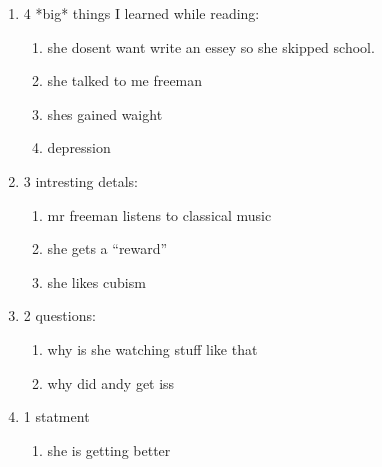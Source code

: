 
\begin{enumerate}
\item 4 *big* things I learned while reading:
  \begin{enumerate}
    \item she dosent want write an essey so she skipped school.
    \item she talked to me freeman 
    \item shes gained waight
    \item depression
  \end{enumerate}
\item 3 intresting detals:
  \begin{enumerate}
    \item mr freeman listens to classical music
    \item she gets a ``reward''
    \item she likes cubism  
  \end{enumerate}
\item 2 questions:
  \begin{enumerate}
    \item why is she watching stuff like that
    \item why did andy get iss
  \end{enumerate}
\item 1 statment
  \begin{enumerate}
    \item she is getting better
  \end{enumerate}
\end{enumerate}

